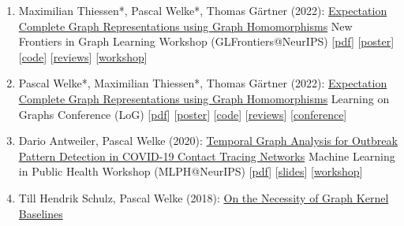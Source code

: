 \documentclass{scrartcl}
\begin{document}
\begin{enumerate}
{[\href{https://logconference.org}{conference}]
}
\item
\label{thiessen2022expectation}
Maximilian Thiessen*, Pascal Welke*, Thomas Gärtner (2022):\newline
\href{https://pwelke.de/publications/thiessen2022glfrontiers.pdf}{Expectation Complete Graph Representations using Graph Homomorphisms}\newline
New Frontiers in Graph Learning Workshop (GLFrontiers@NeurIPS)\newline
{\footnotesize
[\href{https://pwelke.de/publications/thiessen2022glfrontiers.pdf}{pdf}]
[\href{https://pwelke.de/publications/expectation_complete_poster_neurips.pdf}{poster}]
[\href{https://github.com/pwelke/homcount}{code}]
[\href{https://openreview.net/forum?id=Zf-Mn6xzD2B}{reviews}]
[\href{https://glfrontiers.github.io/}{workshop}]
}
\item
\label{welke2022expectation}
Pascal Welke*, Maximilian Thiessen*, Thomas Gärtner (2022):\newline
\href{https://pwelke.de/publications/welke2022log.pdf}{Expectation Complete Graph Representations using Graph Homomorphisms}\newline
Learning on Graphs Conference (LoG)\newline
{\footnotesize
[\href{https://pwelke.de/publications/welke2022log.pdf}{pdf}]
[\href{https://pwelke.de/publications/expectation_complete_poster_neurips.pdf}{poster}]
[\href{https://github.com/pwelke/homcount}{code}]
[\href{https://openreview.net/forum?id=8GJyW4i2oST}{reviews}]
[\href{http://log2022.logconference.org/}{conference}]
}
\item
\label{antweiler2020temporal}
Dario Antweiler, Pascal Welke (2020):\newline
\href{https://pwelke.de/publications/antweiler2020temporal.pdf}{Temporal Graph Analysis for Outbreak Pattern Detection in COVID-19 Contact Tracing Networks}\newline
Machine Learning in Public Health Workshop (MLPH@NeurIPS)\newline
{\footnotesize
[\href{https://pwelke.de/publications/antweiler2020temporal.pdf}{pdf}]
[\href{https://pwelke.de/publications/antweiler2020temporal-slides.pdf}{slides}]
[\href{https://sites.google.com/nyu.edu/mlph2020/}{workshop}]
}
\item
\label{schulz2018necessity}
Till Hendrik Schulz, Pascal Welke (2018):\newline
\href{https://pwelke.de/publications/schulz2018necessity.pdf}{On the Necessity of Graph Kernel Baselines}\newline

\end{enumerate}
\end{document}
